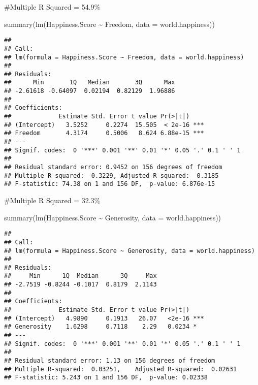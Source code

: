 \documentclass[
]{article}
\newenvironment{Shaded}{\begin{snugshade}}{\end{snugshade}}
\newcommand{\AttributeTok}[1]{\textcolor[rgb]{0.77,0.63,0.00}{#1}}
\newcommand{\FunctionTok}[1]{\textcolor[rgb]{0.00,0.00,0.00}{#1}}
\newcommand{\NormalTok}[1]{#1}
\newcommand{\SpecialCharTok}[1]{\textcolor[rgb]{0.00,0.00,0.00}{#1}}
\begin{document}
\#Multiple R Squared = 54.9\%

\begin{Shaded}
\begin{Highlighting}[]
\FunctionTok{summary}\NormalTok{(}\FunctionTok{lm}\NormalTok{(Happiness.Score }\SpecialCharTok{\textasciitilde{}}\NormalTok{ Freedom, }\AttributeTok{data =}\NormalTok{ world.happiness))}
\end{Highlighting}
\end{Shaded}

\begin{verbatim}
## 
## Call:
## lm(formula = Happiness.Score ~ Freedom, data = world.happiness)
## 
## Residuals:
##      Min       1Q   Median       3Q      Max 
## -2.61618 -0.64097  0.02194  0.82129  1.96886 
## 
## Coefficients:
##             Estimate Std. Error t value Pr(>|t|)    
## (Intercept)   3.5252     0.2274  15.505  < 2e-16 ***
## Freedom       4.3174     0.5006   8.624 6.88e-15 ***
## ---
## Signif. codes:  0 '***' 0.001 '**' 0.01 '*' 0.05 '.' 0.1 ' ' 1
## 
## Residual standard error: 0.9452 on 156 degrees of freedom
## Multiple R-squared:  0.3229, Adjusted R-squared:  0.3185 
## F-statistic: 74.38 on 1 and 156 DF,  p-value: 6.876e-15
\end{verbatim}

\#Multiple R Squared = 32.3\%

\begin{Shaded}
\begin{Highlighting}[]
\FunctionTok{summary}\NormalTok{(}\FunctionTok{lm}\NormalTok{(Happiness.Score }\SpecialCharTok{\textasciitilde{}}\NormalTok{ Generosity, }\AttributeTok{data =}\NormalTok{ world.happiness))}
\end{Highlighting}
\end{Shaded}

\begin{verbatim}
## 
## Call:
## lm(formula = Happiness.Score ~ Generosity, data = world.happiness)
## 
## Residuals:
##     Min      1Q  Median      3Q     Max 
## -2.7519 -0.8244 -0.1017  0.8179  2.1143 
## 
## Coefficients:
##             Estimate Std. Error t value Pr(>|t|)    
## (Intercept)   4.9890     0.1913   26.07   <2e-16 ***
## Generosity    1.6298     0.7118    2.29   0.0234 *  
## ---
## Signif. codes:  0 '***' 0.001 '**' 0.01 '*' 0.05 '.' 0.1 ' ' 1
## 
## Residual standard error: 1.13 on 156 degrees of freedom
## Multiple R-squared:  0.03251,    Adjusted R-squared:  0.02631 
## F-statistic: 5.243 on 1 and 156 DF,  p-value: 0.02338
\end{verbatim}
\end{document}
